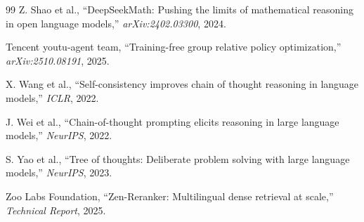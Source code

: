 \begin{thebibliography}{99}
Z. Shao et al., ``DeepSeekMath: Pushing the limits of mathematical reasoning in open language models,'' \textit{arXiv:2402.03300}, 2024.

Tencent youtu-agent team, ``Training-free group relative policy optimization,'' \textit{arXiv:2510.08191}, 2025.

X. Wang et al., ``Self-consistency improves chain of thought reasoning in language models,'' \textit{ICLR}, 2022.

J. Wei et al., ``Chain-of-thought prompting elicits reasoning in large language models,'' \textit{NeurIPS}, 2022.

S. Yao et al., ``Tree of thoughts: Deliberate problem solving with large language models,'' \textit{NeurIPS}, 2023.

Zoo Labs Foundation, ``Zen-Reranker: Multilingual dense retrieval at scale,'' \textit{Technical Report}, 2025.

\end{thebibliography}

\appendix

